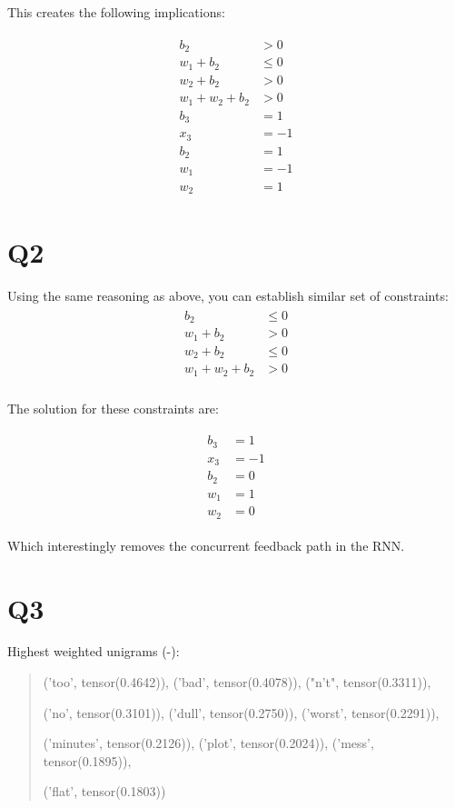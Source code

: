 \documentclass[11pt]{article}
\begin{document}
\noindent This creates the following implications:
	
\begin{align}
	\begin{split}
		b_2 &> 0 \\
		w_1+b_2 &\leq 0 \\
		w_2+b_2 &> 0 \\
		w_1+w_2+b_2 &> 0  \\
		b_3 &= 1 \\
		x_3 &= -1 \\
		b_2 &= 1 \\
		w_1 &= -1 \\
		w_2 &= 1
	\end{split}
\end{align}

\section*{Q2}

Using the same reasoning as above, you can establish similar set of constraints:
\begin{align}
	\begin{split}
		b_2 &\leq 0 \\
		w_1+b_2 &> 0 \\
		w_2+b_2 &\leq 0 \\
		w_1+w_2+b_2 &> 0  \\
	\end{split}
\end{align}

\noindent The solution for these constraints are:

\begin{align}
	\begin{split}
		b_3 &= 1 \\
		x_3 &= -1 \\
		b_2 &= 0 \\
		w_1 &= 1 \\
		w_2 &= 0
	\end{split}
\end{align}

\noindent Which interestingly removes the concurrent feedback path in the RNN.

\section*{Q3}

Highest weighted unigrams (-): 

\begin{quote}
('too', tensor(0.4642)), ('bad', tensor(0.4078)), ("n't", tensor(0.3311)),

('no', tensor(0.3101)), ('dull', tensor(0.2750)), ('worst', tensor(0.2291)), 

('minutes', tensor(0.2126)), ('plot', tensor(0.2024)), ('mess', tensor(0.1895)), 

('flat', tensor(0.1803))              
\end{quote}
\end{document}
